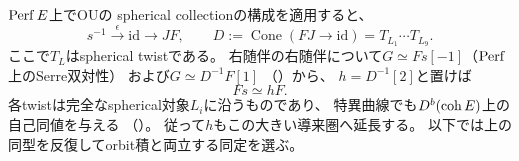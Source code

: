 $\operatorname{Perf} E$上でOU\cite[(3)--(5), p.~2]{OUSpherical2020}の
spherical collectionの構成を適用すると、
\[
 s^{-1}\xrightarrow{\epsilon}\mathrm{id}\longrightarrow JF,\qquad
 D:=\operatorname{Cone}(FJ\longrightarrow\mathrm{id})
   =T_{L_1}\cdots T_{L_9}.
\]
ここで$T_L$はspherical twistである。
右随伴の右随伴について$G\simeq Fs[-1]$（$\operatorname{Perf}$上のSerre双対性）
および$G\simeq D^{-1}F[1]$
（\cite[Definition~5.2, (5.12)]{AnnoLogvinenko2017}）から、
$h=D^{-1}[2]$と置けば
\begin{equation}\label{eq:ou-restriction-commute}
 Fs\simeq hF.
\end{equation}
各twistは完全なspherical対象$L_i$に沿うものであり、
特異曲線でも$D^b(\operatorname{coh} E)$上の自己同値を与える
（\cite[Sections~3--4]{BurbanKreu2006}）。
従って$h$もこの大きい導来圏へ延長する。
以下では上の同型を反復してorbit積と両立する同定を選ぶ。

